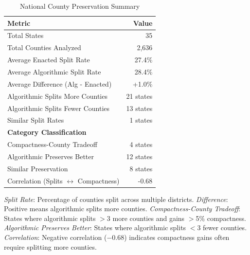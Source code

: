 \begin{table}[t]
\centering
\caption{National County Preservation Summary}
\label{tab:county_preservation_summary}
\begin{tabular}{lr}
\toprule
\textbf{Metric} & \textbf{Value} \\
\midrule
Total States & 35 \\
Total Counties Analyzed & 2,636 \\
\midrule
Average Enacted Split Rate & 27.4\% \\
Average Algorithmic Split Rate & 28.4\% \\
Average Difference (Alg - Enacted) & +1.0\% \\
\midrule
Algorithmic Splits More Counties & 21 states \\
Algorithmic Splits Fewer Counties & 13 states \\
Similar Split Rates & 1 states \\
\midrule
\textbf{Category Classification} & \\
\quad Compactness-County Tradeoff & 4 states \\
\quad Algorithmic Preserves Better & 12 states \\
\quad Similar Preservation & 8 states \\
\midrule
Correlation (Splits $\leftrightarrow$ Compactness) & -0.68 \\
\bottomrule
\end{tabular}
\begin{tablenotes}
\small
\item \textit{Split Rate}: Percentage of counties split across multiple districts. \textit{Difference}: Positive means algorithmic splits more counties. \textit{Compactness-County Tradeoff}: States where algorithmic splits $>$3 more counties and gains $>$5\% compactness. \textit{Algorithmic Preserves Better}: States where algorithmic splits $<$3 fewer counties. \textit{Correlation}: Negative correlation ($-0.68$) indicates compactness gains often require splitting more counties.
\end{tablenotes}
\end{table}
